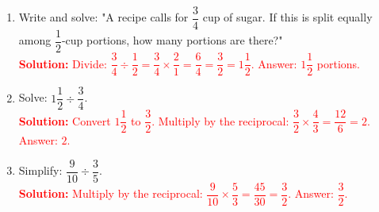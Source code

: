 \documentclass[12pt]{article}
\begin{document}
\begin{tcolorbox}[colframe=black!60, colback=white, 
coltitle=black, colbacktitle=black!15, fonttitle=\bfseries\Large, 
title=Exercises, halign title=center, left=10pt, right=10pt, top=10pt, bottom=60pt]
\begin{enumerate}[itemsep=1em]
    \item Write and solve: "A recipe calls for \( \dfrac{3}{4} \) cup of sugar. If this is split equally among \( \dfrac{1}{2} \)-cup portions, how many portions are there?"\\
    \textcolor{red}{\textbf{Solution:} Divide: \( \dfrac{3}{4} \div \dfrac{1}{2} = \dfrac{3}{4} \times \dfrac{2}{1} = \dfrac{6}{4} = \dfrac{3}{2} = 1 \dfrac{1}{2} \). Answer: \( 1 \dfrac{1}{2} \) portions.}

    \item Solve: \( 1 \dfrac{1}{2} \div \dfrac{3}{4} \).\\
    \textcolor{red}{\textbf{Solution:} Convert \( 1 \dfrac{1}{2} \) to \( \dfrac{3}{2} \). Multiply by the reciprocal: \( \dfrac{3}{2} \times \dfrac{4}{3} = \dfrac{12}{6} = 2 \). Answer: \( 2 \).}

    \item Simplify: \( \dfrac{9}{10} \div \dfrac{3}{5} \).\\
    \textcolor{red}{\textbf{Solution:} Multiply by the reciprocal: \( \dfrac{9}{10} \times \dfrac{5}{3} = \dfrac{45}{30} = \dfrac{3}{2} \). Answer: \( \dfrac{3}{2} \).}
\end{enumerate}
\end{tcolorbox}
\end{document}
